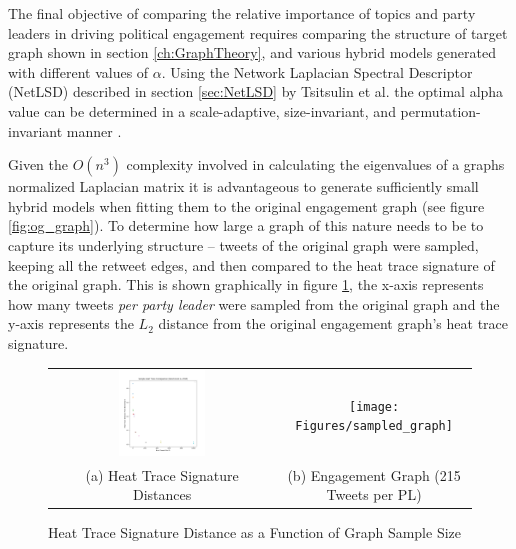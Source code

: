 The final objective of comparing the relative importance of topics and party
leaders in driving political engagement requires comparing the structure of
target graph shown in section \ref{ch:GraphTheory}, and various hybrid models generated
with different values of $\alpha$. Using the Network Laplacian Spectral
Descriptor (NetLSD) described in section \ref{sec:NetLSD} by Tsitsulin et al. the optimal
alpha value can be determined in a scale-adaptive, size-invariant, and
permutation-invariant manner \cite{netlsd}.

Given the $O(n^{3})$ complexity involved in calculating the eigenvalues of a
graphs normalized Laplacian matrix it is advantageous to generate sufficiently
small hybrid models when fitting them to the original engagement graph (see
figure \ref{fig:og_graph}). To determine how large a graph of this nature needs
to be to capture its underlying structure -- tweets of the original graph were
sampled, keeping all the retweet edges, and then compared to the heat trace
signature of the original graph. This is shown graphically in figure
\ref{fig:dist_from_original_graph_over_sample_size}, the x-axis represents how
many tweets \emph{per party leader} were sampled from the original graph and the
y-axis represents the $L_{2}$ distance from the original engagement graph's heat
trace signature. 

\begin{singlespacing}
    \begin{figure}[H]
    \centering
    \begin{tabular}{cc}
        \includegraphics[width=0.40\textwidth]{Figures/dist_from_original_graph_over_sample_size} &
        \texttt{[image: Figures/sampled\_graph]} \\
        (a) Heat Trace Signature Distances & (b) Engagement Graph (215 Tweets per PL)\\[6pt]
    \end{tabular}
    \caption[Heat Trace Signature Distance as a Function of Graph Sample Size]{Heat Trace Signature Distance as a Function of Graph Sample Size}
    \label{fig:dist_from_original_graph_over_sample_size}
    \end{figure}
\end{singlespacing}

